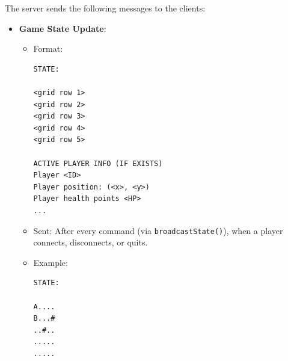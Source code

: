 \documentclass{article}
\begin{document}
\begin{enumerate}
        The server sends the following messages to the clients:
        \begin {itemize}
            \item \textbf{Game State Update}:
                \begin{itemize}
                    \item Format:
\begin{verbatim}
STATE:

<grid row 1>
<grid row 2>
<grid row 3>
<grid row 4>
<grid row 5>

ACTIVE PLAYER INFO (IF EXISTS)
Player <ID>
Player position: (<x>, <y>)
Player health points <HP>
...
\end{verbatim}
                \item Sent: After every command (via \texttt{broadcastState()}), when a player connects, disconnects, or quits.
                \item Example:
\begin{verbatim}
STATE:

A....
B...#
..#..
.....
.....


\end{verbatim}
\end{itemize}
\end{itemize}
\end{enumerate}
\end{document}
